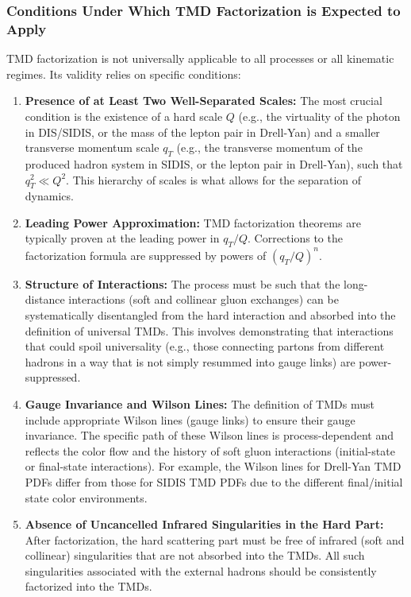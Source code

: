 \documentclass[11pt]{article}
\begin{document}
\subsubsection{Conditions Under Which TMD Factorization is Expected to Apply}

TMD factorization is not universally applicable to all processes or all kinematic regimes. Its validity relies on specific conditions:
\begin{enumerate}
  \item \textbf{Presence of at Least Two Well-Separated Scales:} The most crucial condition is the existence of a hard scale $Q$ (e.g., the virtuality of the photon in DIS/SIDIS, or the mass of the lepton pair in Drell-Yan) and a smaller transverse momentum scale $q_T$ (e.g., the transverse momentum of the produced hadron system in SIDIS, or the lepton pair in Drell-Yan), such that $q_T^2 \ll Q^2$. This hierarchy of scales is what allows for the separation of dynamics.
  \item \textbf{Leading Power Approximation:} TMD factorization theorems are typically proven at the leading power in $q_T/Q$. Corrections to the factorization formula are suppressed by powers of $(q_T/Q)^n$.
  \item \textbf{Structure of Interactions:} The process must be such that the long-distance interactions (soft and collinear gluon exchanges) can be systematically disentangled from the hard interaction and absorbed into the definition of universal TMDs. This involves demonstrating that interactions that could spoil universality (e.g., those connecting partons from different hadrons in a way that is not simply resummed into gauge links) are power-suppressed.
  \item \textbf{Gauge Invariance and Wilson Lines:} The definition of TMDs must include appropriate Wilson lines (gauge links) to ensure their gauge invariance. The specific path of these Wilson lines is process-dependent and reflects the color flow and the history of soft gluon interactions (initial-state or final-state interactions). For example, the Wilson lines for Drell-Yan TMD PDFs differ from those for SIDIS TMD PDFs due to the different final/initial state color environments.
  \item \textbf{Absence of Uncancelled Infrared Singularities in the Hard Part:} After factorization, the hard scattering part must be free of infrared (soft and collinear) singularities that are not absorbed into the TMDs. All such singularities associated with the external hadrons should be consistently factorized into the TMDs.
\end{enumerate}
\end{document}
